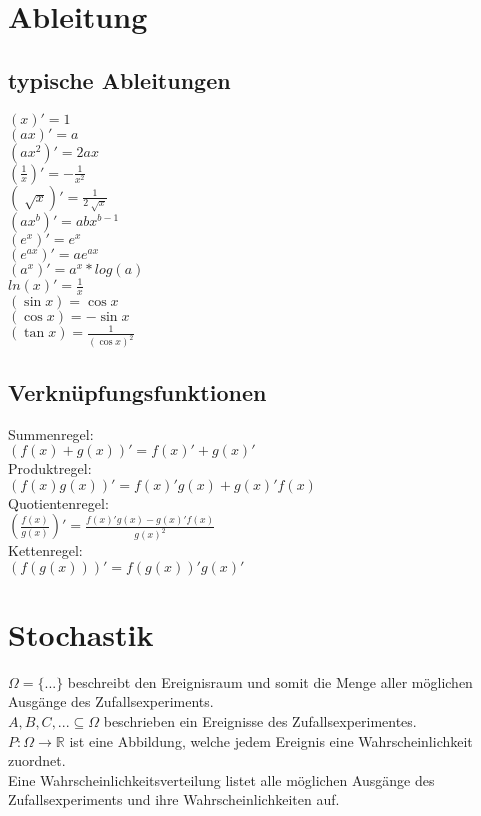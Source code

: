 \documentclass[a4paper, 10pt, landscape]{article}
\begin{document}
\begin{multicols}{5}
\begin{small}
	\section{Ableitung}
		\subsection{typische Ableitungen}
			\begin{multicols}{2}		
				$(x)' = 1$ \\
				$(ax)' = a$ \\
				$(ax^2)' = 2ax$ \\
				$(\frac{1}{x})' = -\frac{1}{x^2}$ \\
				$(\sqrt[]{x})' = \frac{1}{2\sqrt[]{x}}$ \\
				$(ax^b)' = abx^{b-1}$ \\
				$(e^x)' = e^x $ \\
				$(e^{ax})' = ae^{ax} $ \\
				$(a^x)' = a^x*log(a) $ \\
				$ln(x)' = \frac{1}{x}$ \\
				$(\sin x) = \cos x$ \\
				$(\cos x) = -\sin x$ \\
				$(\tan x) = \frac{1}{(\cos x)^2}$
			\end{multicols}
		\subsection{Verknüpfungsfunktionen}
			Summenregel:\\
			$(f(x) + g(x))' = f(x)' + g(x)'$  \\ 
			Produktregel:\\
			$(f(x)g(x))' = f(x)'g(x)+g(x)'f(x)$  \\
			Quotientenregel:\\
			$(\frac{f(x)}{g(x)})' = \frac{f(x)'g(x)-g(x)'f(x)}{g(x)^2}$ \\
			Kettenregel:\\
			$(f(g(x)))' = f(g(x))'g(x)'$ \\
	\section{Stochastik}
	    $\Omega = \{ ... \}$ beschreibt den Ereignisraum und somit die Menge aller möglichen Ausgänge des Zufallsexperiments.\\
    	$A, B, C, ... \subseteq \Omega$ beschrieben ein Ereignisse des Zufallsexperimentes.\\
    	$P: \Omega \rightarrow \mathbb{R}$ ist eine Abbildung, welche jedem Ereignis eine Wahrscheinlichkeit zuordnet.\\
    	Eine Wahrscheinlichkeitsverteilung listet alle möglichen Ausgänge des Zufallsexperiments und ihre Wahrscheinlichkeiten auf.

\end{small}
\end{multicols}
\end{document}

